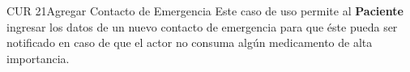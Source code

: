 \begin{UseCase}{CUR 21}{Agregar Contacto de Emergencia}
    {
    	Este caso de uso permite al \textbf{Paciente} ingresar los datos de un nuevo contacto de emergencia para que éste pueda ser notificado en caso de que el actor no consuma algún medicamento de alta importancia.  
    }


\end{UseCase}
